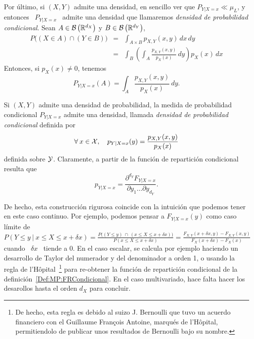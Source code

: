 Por \'ultimo, si $(X,Y)$ admite una densidad, en sencillo ver que $P_{Y|X=x} \ll
\mu_L$,  y entonces  \ $P_{Y|X=x}$  \ admite  una densidad  que  llamaremos {\it
  densidad  de  probabilidad  condicional}.  Sean $A  \in  \mathcal{B}\left(  \mathbb{R}^{d_X}
\right)$ y $B \in \mathcal{B}\left( \mathbb{R}^{d_Y} \right)$,
%
\begin{eqnarray*}
P\Big( (X \in A) \cap (Y \in B) \Big) & = & \int_{A \times B} p_{X,Y}(x,y) \, dx \, dy\\[2mm]
%
& = & \int_B \left( \int_A \frac{p_{X,Y}(x,y)}{p_X(x)} \, dy \right) p_X(x) \, dx
\end{eqnarray*}
%
Entonces, si $p_X(x) \ne 0$, tenemos
%
\[
P_{Y|X=x}(A) = \int_A \frac{p_{X,Y}(x,y)}{p_X(x)} \, dy.
\]
%
\begin{teorema}
\label{Def:MP:DensidadCondicional}
%
  Si  $(X,Y)$ admite  una densidad  de probabilidad,  la medida  de probabilidad
  condicional  $P_{Y|X=x}$  admite  una   densidad,  llamada  {\it  densidad  de
    probabilidad condicional} definida por
  \[
  \forall \: x \in \mathcal{X}, \quad p_{Y|X=x}(y) = \frac{p_{X,Y}(x,y)}{p_X(x)}
  \]
  definida  sobre $\mathcal{Y}$. Claramente,  a partir de  la funci\'on  de repartici\'on
  condicional resulta que
  \[
  p_{Y|X=x} = \frac{\partial^{d_Y}  F_{Y|X=x}}{\partial y_1 \ldots \partial y_{d_Y}}.
  \]
\end{teorema}

De hecho, esta  construcci\'on rigurosa coincide con la  intuici\'on que podemos
tener en este  caso continuo. Por ejemplo, podemos  pensar a $F_{Y|X=x}(y)$ como
caso l\'imite de $\displaystyle P\left( Y \le y \: \Big| \: x \le X \le x+\delta
  x \right) = \frac{P\big( \left( Y \le y  \right) \: \cap \: \left( x \le X \le
    x+\delta  x  \right)  \big)}{P\left( x  \le  X  \le  x+\delta x  \right)}  =
\frac{F_{X,Y}(x+\delta  x ,  y) -  F_{X,Y}(x  , y)}{F_X(x+\delta  x) -  F_X(x)}$
cuando \ $\delta  x$ \ tiende a 0.   En el caso escalar, se  calcula por ejemplo
haciendo un  desarrollo de Taylor del numerador  y del denominador a  orden 1, o
usando la regla de l'H\^opital~\footnote{De hecho, esta regla es debido al suizo
  J.  Bernoulli  que tuvo  un acuerdo financiero  con el  Guillaume Fran\c{c}ois
  Antoine, marqu\'es  de l'H\^opital, permitiendolo de  publicar unos resultados
  de Bernoulli bajo  su nombre.}  para re-obtener la  funci\'on de repartici\'on
condicional   de  la   definici\'on~\ref{Def:MP:FRCondicional}.    En  el   caso
multivariado,  hace  falta  hacer  los  desarollos hasta  el  orden  $d_X$  para
concluir.

